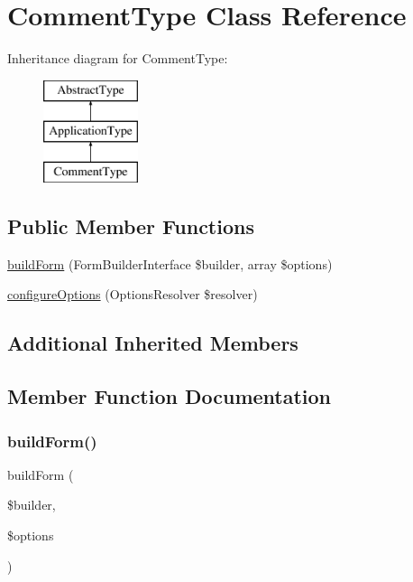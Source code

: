 \hypertarget{class_app_1_1_form_1_1_comment_type}{}\section{Comment\+Type Class Reference}
\label{class_app_1_1_form_1_1_comment_type}
Inheritance diagram for Comment\+Type\+:\begin{figure}[H]
\begin{center}
\leavevmode
\includegraphics[height=3.000000cm]{class_app_1_1_form_1_1_comment_type}
\end{center}
\end{figure}
\subsection*{Public Member Functions}
\begin{DoxyCompactItemize}
\item 
\mbox{\hyperlink{class_app_1_1_form_1_1_comment_type_a83c3745710374f9c5a1eb0686fe2dfab}{build\+Form}} (Form\+Builder\+Interface \$builder, array \$options)
\item 
\mbox{\hyperlink{class_app_1_1_form_1_1_comment_type_a8ff68a86f5090b5df973286836e46ead}{configure\+Options}} (Options\+Resolver \$resolver)
\end{DoxyCompactItemize}
\subsection*{Additional Inherited Members}


\subsection{Member Function Documentation}
\mbox{\label{class_app_1_1_form_1_1_comment_type_a83c3745710374f9c5a1eb0686fe2dfab}} 
\subsubsection{\texorpdfstring{buildForm()}{buildForm()}}
{\footnotesize\ttfamily build\+Form (\begin{DoxyParamCaption}\item[{Form\+Builder\+Interface}]{\$builder,  }\item[{array}]{\$options }\end{DoxyParamCaption})}

